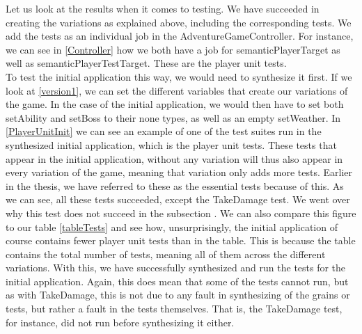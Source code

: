 Let us look at the results when it comes to testing. We have succeeded in creating the variations as explained above, including the corresponding tests. We add the tests as an individual job in the AdventureGameController. For instance, we can see in \autoref{Controller} how we both have a job for semanticPlayerTarget as well as semanticPlayerTestTarget. These are the player unit tests. \\
To test the initial application this way, we would need to synthesize it first. If we look at \autoref{version1}, we can set the different variables that create our variations of the game. In the case of the initial application, we would then have to set both setAbility and setBoss to their none types, as well as an empty setWeather.
In \autoref{PlayerUnitInit} we can see an example of one of the test suites run in the synthesized initial application, which is the player unit tests. These tests that appear in the initial application, without any variation will thus also appear in every variation of the game, meaning that variation only adds more tests. Earlier in the thesis, we have referred to these as the essential tests because of this.
As we can see, all these tests succeeded, except the TakeDamage test. We went over why this test does not succeed in the subsection . We can also compare this figure to our table \autoref{tableTests} and see how, unsurprisingly, the initial application of course contains fewer player unit tests than in the table. This is because the table contains the total number of tests, meaning all of them across the different variations. With this, we have successfully synthesized and run the tests for the initial application. Again, this does mean that some of the tests cannot run, but as with TakeDamage, this is not due to any fault in synthesizing of the grains or tests, but rather a fault in the tests themselves. That is, the TakeDamage test, for instance, did not run before synthesizing it either. 

